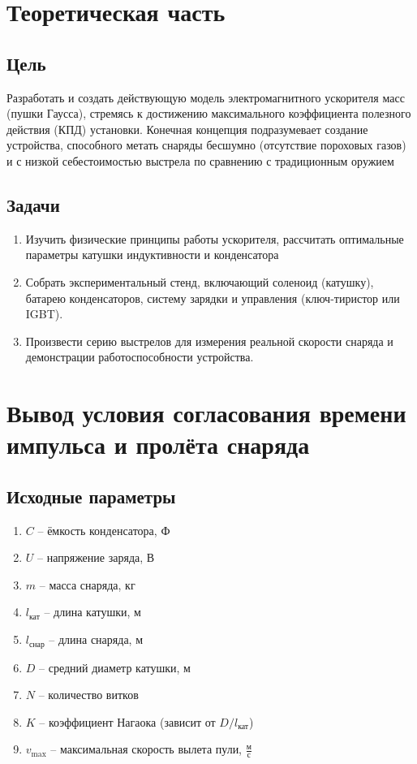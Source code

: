 \documentclass[14pt]{extarticle}
\begin{document}
\section{Теоретическая часть}

\subsection{Цель}

Разработать и создать действующую модель электромагнитного ускорителя масс (пушки Гаусса), стремясь к достижению максимального коэффициента полезного действия (КПД) установки. Конечная концепция подразумевает создание устройства, способного метать снаряды бесшумно (отсутствие пороховых газов) и с низкой себестоимостью выстрела по сравнению с традиционным оружием


\subsection{Задачи}
\begin{enumerate}
\item Изучить физические принципы работы ускорителя, рассчитать оптимальные параметры катушки индуктивности и конденсатора
    
\item Собрать экспериментальный стенд, включающий соленоид (катушку), батарею конденсаторов, систему зарядки и управления (ключ-тиристор или IGBT).
    
\item Произвести серию выстрелов для измерения реальной скорости снаряда и демонстрации работоспособности устройства.
\end{enumerate}
\newpage
\section{Вывод условия согласования времени импульса и пролёта снаряда}

\subsection{Исходные параметры}
\begin{enumerate}
    \item $C$ -- ёмкость конденсатора, Ф
    \item $U$ -- напряжение заряда, В
    \item $m$ -- масса снаряда, кг
    \item $l_{\text{кат}}$ -- длина катушки, м
    \item $l_{\text{снар}}$ -- длина снаряда, м
    \item $D$ -- средний диаметр катушки, м
    \item $N$ -- количество витков
    \item $K$ -- коэффициент Нагаока (зависит от $D/l_{\text{кат}}$)
    \item $v_{\max}$ -- максимальная скорость вылета пули, $\frac{\text{м}}{\text{с}}$ 
\end{enumerate}
\end{document}

